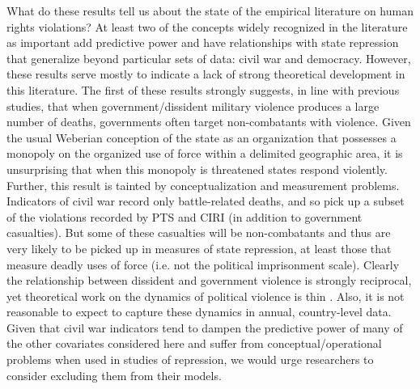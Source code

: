 \documentclass[12pt]{article}
\begin{document}
What do these results tell us about the state of the empirical literature on human rights violations? At least two of the concepts widely recognized in the literature as important add predictive power and have relationships with state repression that generalize beyond particular sets of data: civil war and democracy. However, these results serve mostly to indicate a lack of strong theoretical development in this literature. The first of these results strongly suggests, in line with previous studies, that when government/dissident military violence produces a large number of deaths, governments often target non-combatants with violence. Given the usual Weberian conception of the state as an organization that possesses a monopoly on the organized use of force within a delimited geographic area, it is unsurprising that when this monopoly is threatened states respond violently. Further, this result is tainted by conceptualization and measurement problems. Indicators of civil war record only battle-related deaths, and so pick up a subset of the violations recorded by PTS and CIRI (in addition to government casualties). But some of these casualties will be non-combatants and thus are very likely to be picked up in measures of state repression, at least those that measure deadly uses of force (i.e. not the political imprisonment scale). Clearly the relationship between dissident and government violence is strongly reciprocal, yet theoretical work on the dynamics of political violence is thin \citep[But see, e.g.][]{Moore2000,Pierskalla2010,RitterJCR}. Also, it is not reasonable to expect to capture these dynamics in annual, country-level data. Given that civil war indicators tend to dampen the predictive power of many of the other covariates considered here and suffer from conceptual/operational problems when used in studies of repression, we would urge researchers to consider excluding them from their models.  
\end{document}
